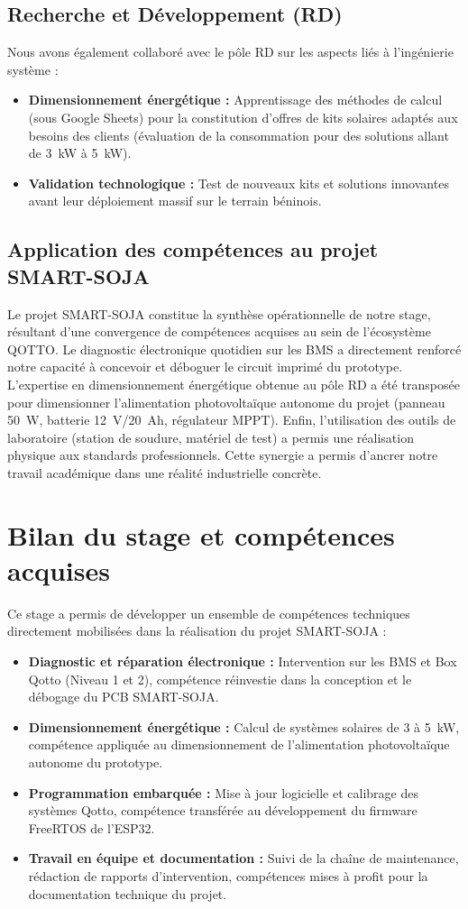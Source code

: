 \subsection{Recherche et Développement (RD)}
Nous avons également collaboré avec le pôle RD sur les aspects liés à l'ingénierie système :
\begin{itemize}
    \item \textbf{Dimensionnement énergétique :} Apprentissage des méthodes de calcul (sous Google Sheets) pour la constitution d'offres de kits solaires adaptés aux besoins des clients (évaluation de la consommation pour des solutions allant de 3~kW à 5~kW).
    \item \textbf{Validation technologique :} Test de nouveaux kits et solutions innovantes avant leur déploiement massif sur le terrain béninois.
\end{itemize}

\subsection{Application des compétences au projet SMART-SOJA}
Le projet SMART-SOJA constitue la synthèse opérationnelle de notre stage, résultant d'une convergence de compétences acquises au sein de l'écosystème QOTTO. Le diagnostic électronique quotidien sur les BMS a directement renforcé notre capacité à concevoir et déboguer le circuit imprimé du prototype. L'expertise en dimensionnement énergétique obtenue au pôle RD a été transposée pour dimensionner l'alimentation photovoltaïque autonome du projet (panneau 50~W, batterie 12~V/20~Ah, régulateur MPPT). Enfin, l'utilisation des outils de laboratoire (station de soudure, matériel de test) a permis une réalisation physique aux standards professionnels. Cette synergie a permis d'ancrer notre travail académique dans une réalité industrielle concrète.

\section{Bilan du stage et compétences acquises}
Ce stage a permis de développer un ensemble de compétences techniques directement mobilisées dans la réalisation du projet SMART-SOJA :
\begin{itemize}
    \item \textbf{Diagnostic et réparation électronique :} Intervention sur les BMS et Box Qotto (Niveau 1 et 2), compétence réinvestie dans la conception et le débogage du PCB SMART-SOJA.
    \item \textbf{Dimensionnement énergétique :} Calcul de systèmes solaires de 3 à 5~kW, compétence appliquée au dimensionnement de l'alimentation photovoltaïque autonome du prototype.
    \item \textbf{Programmation embarquée :} Mise à jour logicielle et calibrage des systèmes Qotto, compétence transférée au développement du firmware FreeRTOS de l'ESP32.
    \item \textbf{Travail en équipe et documentation :} Suivi de la chaîne de maintenance, rédaction de rapports d'intervention, compétences mises à profit pour la documentation technique du projet.
\end{itemize}

